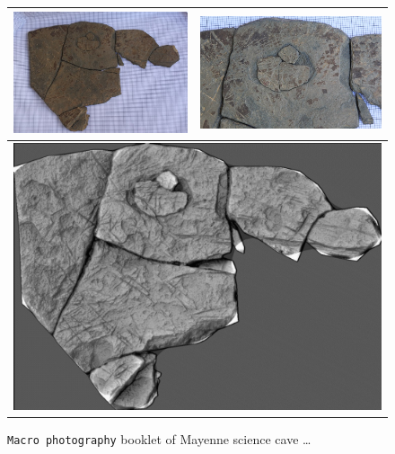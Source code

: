 \begin{figure}
\begin{tabular}{||c|c||}
   \hline \hline
   \includegraphics[width=72mm]{FIGS/SAMPLES/Doc-Pijo1.jpg}&
   \includegraphics[width=75mm]{FIGS/SAMPLES/Doc-Pijo2.jpg} \\ \hline  \hline
    \multicolumn{2}{|c|}{\includegraphics[width=150mm]{FIGS/SAMPLES/Doc-Pijo3.jpg}}  \\ \hline  \hline
\end{tabular}
\caption{{\tt Macro photography} booklet of Mayenne science cave \dots}
\end{figure}











